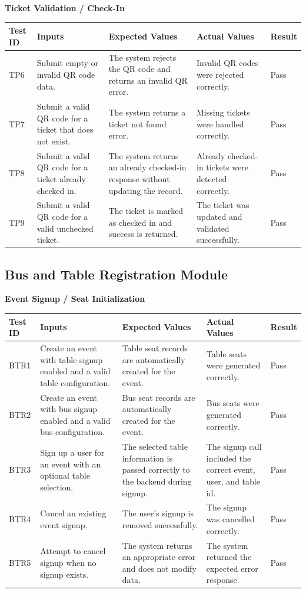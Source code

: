 \documentclass[12pt, titlepage]{article}
\begin{document}
\vspace{0.5cm}

\textbf{Ticket Validation / Check-In}

{\small
\setlength{\tabcolsep}{4pt}
\begin{tabularx}{\textwidth}{L{1.6cm}Y Y Y L{1.4cm}}
\toprule
\textbf{Test ID} & \textbf{Inputs} & \textbf{Expected Values} & \textbf{Actual Values} & \textbf{Result} \\
\midrule
TP6 & Submit empty or invalid QR code data. & The system rejects the QR code and returns an invalid QR error. & Invalid QR codes were rejected correctly. & Pass \\
TP7 & Submit a valid QR code for a ticket that does not exist. & The system returns a ticket not found error. & Missing tickets were handled correctly. & Pass \\
TP8 & Submit a valid QR code for a ticket already checked in. & The system returns an already checked-in response without updating the record. & Already checked-in tickets were detected correctly. & Pass \\
TP9 & Submit a valid QR code for a valid unchecked ticket. & The ticket is marked as checked in and success is returned. & The ticket was updated and validated successfully. & Pass \\
\bottomrule
\end{tabularx}
}

\subsection{Bus and Table Registration Module}

\textbf{Event Signup / Seat Initialization}

{\small
\setlength{\tabcolsep}{4pt}
\begin{tabularx}{\textwidth}{L{1.6cm}Y Y Y L{1.4cm}}
\toprule
\textbf{Test ID} & \textbf{Inputs} & \textbf{Expected Values} & \textbf{Actual Values} & \textbf{Result} \\
\midrule
BTR1 & Create an event with table signup enabled and a valid table configuration. & Table seat records are automatically created for the event. & Table seats were generated correctly. & Pass \\
BTR2 & Create an event with bus signup enabled and a valid bus configuration. & Bus seat records are automatically created for the event. & Bus seats were generated correctly. & Pass \\
BTR3 & Sign up a user for an event with an optional table selection. & The selected table information is passed correctly to the backend during signup. & The signup call included the correct event, user, and table id. & Pass \\
BTR4 & Cancel an existing event signup. & The user's signup is removed successfully. & The signup was cancelled correctly. & Pass \\
BTR5 & Attempt to cancel signup when no signup exists. & The system returns an appropriate error and does not modify data. & The system returned the expected error response. & Pass \\
\bottomrule
\end{tabularx}
}
\end{document}
